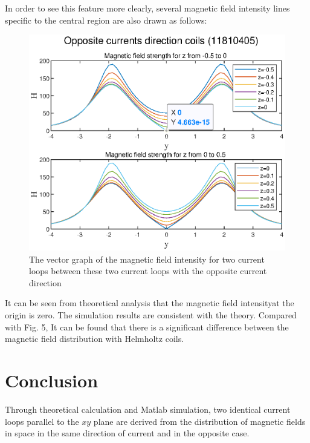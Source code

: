 \documentclass[journal,twocolumn,letterpaper]{IEEEJERM}
\begin{document}
In order to see this feature more clearly, several magnetic field  intensity lines specific to the central region are also drawn as follows:
\begin{figure}[H]   
	\centering	        \includegraphics[width=0.9\linewidth]{F3-2.eps}
	\caption{The vector graph of the magnetic field intensity for two current loops  between these two current loops with the opposite current direction }	  
	\label{fig8} 
\end{figure}
It can be seen from theoretical analysis that the magnetic field intensityat the origin is zero. The simulation results are consistent with the theory. Compared with Fig. 5, 
It can be found that there is a significant difference between the magnetic field distribution with Helmholtz coils.
\newpage
\section{Conclusion}
Through theoretical calculation and Matlab simulation, two identical current loops parallel to the $ xy $ plane are derived from the distribution of magnetic fields in space in the same direction of current and in the opposite case.
\end{document}
